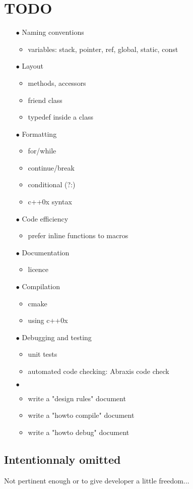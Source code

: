 \section{TODO}
\begin{itemize}
\item[$\bullet$] Naming conventions
  \begin{itemize}
  \item variables: stack, pointer, ref, global, static, const
  \end{itemize}
\item[$\bullet$] Layout
  \begin{itemize}
  \item methods, accessors
  \item friend class
  \item typedef inside a class
  \end{itemize}
\item[$\bullet$] Formatting
  \begin{itemize}
  \item for/while
  \item continue/break
  \item conditional (?:)
  \item c++0x syntax
  \end{itemize}
\item[$\bullet$] Code efficiency
  \begin{itemize}
  \item prefer inline functions to macros
  \end{itemize}
\item[$\bullet$] Documentation
  \begin{itemize}
  \item licence
  \end{itemize} 
\item[$\bullet$] Compilation
  \begin{itemize}
  \item cmake
  \item using c++0x
  \end{itemize}
\item[$\bullet$] Debugging and testing
  \begin{itemize}
  \item unit tests
  \item automated code checking: Abraxis code check
  \end{itemize}
\item[$\bullet$] 
  \begin{itemize}
  \item write a "design rules" document
  \item write a "howto compile" document
  \item write a "howto debug" document
  \end{itemize}
\end{itemize}

\subsection{Intentionnaly omitted}
Not pertinent enough or to give developer a little freedom...
